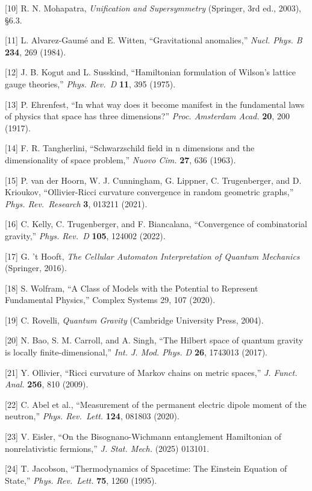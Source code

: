 \documentclass[
  11pt,
]{article}
\begin{document}
{[}10{]} R. N. Mohapatra, \emph{Unification and Supersymmetry}
(Springer, 3rd ed., 2003), §6.3.

{[}11{]} L. Alvarez-Gaumé and E. Witten, ``Gravitational anomalies,''
\emph{Nucl. Phys. B} \textbf{234}, 269 (1984).

{[}12{]} J. B. Kogut and L. Susskind, ``Hamiltonian formulation of
Wilson's lattice gauge theories,'' \emph{Phys. Rev.~D} \textbf{11}, 395
(1975).

{[}13{]} P. Ehrenfest, ``In what way does it become manifest in the
fundamental laws of physics that space has three dimensions?''
\emph{Proc. Amsterdam Acad.} \textbf{20}, 200 (1917).

{[}14{]} F. R. Tangherlini, ``Schwarzschild field in n dimensions and
the dimensionality of space problem,'' \emph{Nuovo Cim.} \textbf{27},
636 (1963).

{[}15{]} P. van der Hoorn, W. J. Cunningham, G. Lippner, C.
Trugenberger, and D. Krioukov, ``Ollivier-Ricci curvature convergence in
random geometric graphs,'' \emph{Phys. Rev.~Research} \textbf{3}, 013211
(2021).

{[}16{]} C. Kelly, C. Trugenberger, and F. Biancalana, ``Convergence of
combinatorial gravity,'' \emph{Phys. Rev.~D} \textbf{105}, 124002
(2022).

{[}17{]} G. 't Hooft, \emph{The Cellular Automaton Interpretation of
Quantum Mechanics} (Springer, 2016).

{[}18{]} S. Wolfram, ``A Class of Models with the Potential to Represent
Fundamental Physics,'' Complex Systems 29, 107 (2020).

{[}19{]} C. Rovelli, \emph{Quantum Gravity} (Cambridge University Press,
2004).

{[}20{]} N. Bao, S. M. Carroll, and A. Singh, ``The Hilbert space of
quantum gravity is locally finite-dimensional,'' \emph{Int. J. Mod.
Phys. D} \textbf{26}, 1743013 (2017).

{[}21{]} Y. Ollivier, ``Ricci curvature of Markov chains on metric
spaces,'' \emph{J. Funct. Anal.} \textbf{256}, 810 (2009).

{[}22{]} C. Abel et al., ``Measurement of the permanent electric dipole
moment of the neutron,'' \emph{Phys. Rev.~Lett.} \textbf{124}, 081803
(2020).

{[}23{]} V. Eisler, ``On the Bisognano-Wichmann entanglement Hamiltonian
of nonrelativistic fermions,'' \emph{J. Stat. Mech.} (2025) 013101.

{[}24{]} T. Jacobson, ``Thermodynamics of Spacetime: The Einstein
Equation of State,'' \emph{Phys. Rev.~Lett.} \textbf{75}, 1260 (1995).
\end{document}

